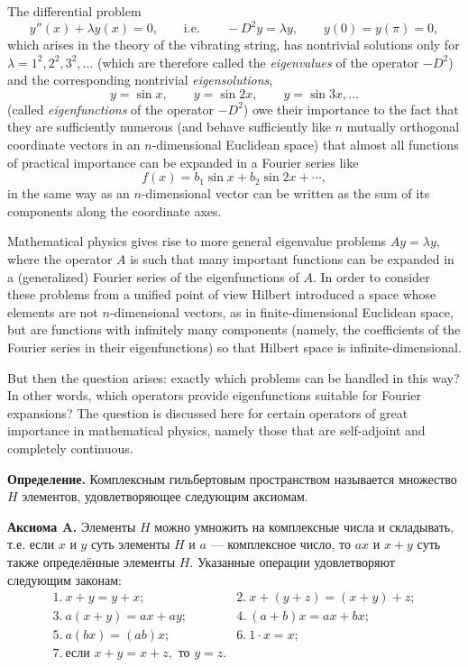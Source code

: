 \begin{sourcebox}
The differential problem
\[
y''(x)+\lambda y(x)=0,\qquad \text{i.e.}\qquad -D^2y=\lambda y,\qquad y(0)=y(\pi)=0,
\]
which arises in the theory of the vibrating string, has nontrivial solutions only for $\lambda=1^2,2^2,3^2,\ldots$ (which are therefore called the \emph{eigenvalues} of the operator $-D^2$) and the corresponding nontrivial \emph{eigensolutions},
\[
y=\sin x,\qquad y=\sin2x,\qquad y=\sin3x,\ldots
\]
(called \emph{eigenfunctions} of the operator $-D^2$) owe their importance to the fact that they are sufficiently numerous (and behave sufficiently like $n$ mutually orthogonal coordinate vectors in an $n$-dimensional Euclidean space) that almost all functions of practical importance can be expanded in a Fourier series like
\[
f(x)=b_1\sin x+b_2\sin2x+\cdots,
\]
in the same way as an $n$-dimensional vector can be written as the sum of its components along the coordinate axes.

Mathematical physics gives rise to more general eigenvalue problems $Ay=\lambda y$, where the operator $A$ is such that many important functions can be expanded in a (generalized) Fourier series of the eigenfunctions of $A$. In order to consider these problems from a unified point of view Hilbert introduced a space whose elements are not $n$-dimensional vectors, as in finite-dimensional Euclidean space, but are functions with infinitely many components (namely, the coefficients of the Fourier series in their eigenfunctions) so that Hilbert space is infinite-dimensional.

But then the question arises: exactly which problems can be handled in this way? In other words, which operators provide eigenfunctions suitable for Fourier expansions? The question is discussed here for certain operators of great importance in mathematical physics, namely those that are self-adjoint and completely continuous.
\end{sourcebox}

\begin{rusblock}
\textbf{Определение.} Комплексным гильбертовым пространством называется множество $H$ элементов, удовлетворяющее следующим аксиомам.

\textbf{Аксиома A.} Элементы $H$ можно умножить на комплексные числа и складывать, т.е. если $x$ и $y$ суть элементы $H$ и $a$ --- комплексное число, то $ax$ и $x+y$ суть также определённые элементы $H$. Указанные операции удовлетворяют следующим законам:
\[
\begin{array}{ll}
1.\ x+y=y+x; & 2.\ x+(y+z)=(x+y)+z;\\
3.\ a(x+y)=ax+ay; & 4.\ (a+b)x=ax+bx;\\
5.\ a(bx)=(ab)x; & 6.\ 1\cdot x=x;\\
7.\ \text{если }x+y=x+z,\text{ то }y=z.&
\end{array}
\]
\end{rusblock}


